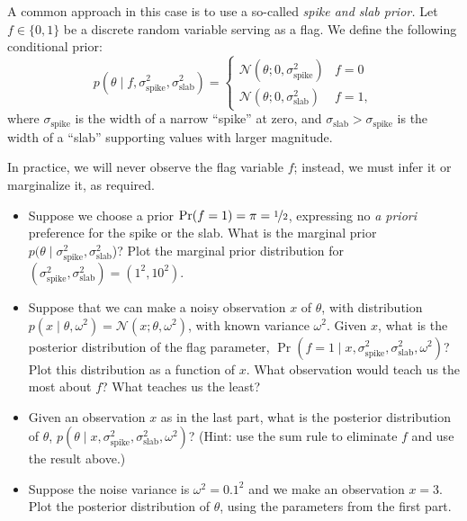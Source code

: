 \documentclass{article}
\newcommand{\given}{\mid}
\newcommand{\mc}[1]{\mathcal{#1}}
\begin{document}
\begin{enumerate}
  A common approach in this case is to use a so-called \emph{spike and
    slab prior.} Let $f \in \{0, 1\}$ be a discrete random variable
  serving as a flag.  We define the following conditional prior:
  \begin{equation*}
    p(\theta \given f, \sigma_{\text{spike}}^2, \sigma_{\text{slab}}^2)
    =
    \begin{cases}
      \mc{N}(\theta; 0, \sigma_{\text{spike}}^2) & f = 0 \\
      \mc{N}(\theta; 0, \sigma_{\text{slab}}^2)  & f = 1,
    \end{cases}
  \end{equation*}
  where $\sigma_{\text{spike}}$ is the width of a narrow ``spike'' at
  zero, and $\sigma_{\text{slab}} > \sigma_{\text{spike}}$ is the
  width of a ``slab'' supporting values with larger magnitude.

  In practice, we will never observe the flag variable $f$; instead,
  we must infer it or marginalize it, as required.
  \begin{itemize}
  \item
    Suppose we choose a prior $\Pr(f = 1) = \pi = \nicefrac{1}{2}$,
    expressing no \emph{a priori} preference for the spike or the
    slab.  What is the marginal prior $p(\theta \given
    \sigma_{\text{spike}}^2, \sigma_{\text{slab}}^2$)?  Plot the
    marginal prior distribution for $(\sigma_{\text{spike}}^2,
    \sigma_{\text{slab}}^2) = (1^2, 10^2)$.
  \item
    Suppose that we can make a noisy observation $x$ of $\theta$, with
    distribution $p(x \given \theta, \omega^2) = \mc{N}(x; \theta,
    \omega^2)$, with known variance $\omega^2$.  Given $x$, what is
    the posterior distribution of the flag parameter, $\Pr(f = 1
    \given x, \sigma_{\text{spike}}^2, \sigma_{\text{slab}}^2,
    \omega^2)$?  Plot this distribution as a function of $x$.  What
    observation would teach us the most about $f$?  What teaches us
    the least?
  \item
    Given an observation $x$ as in the last part, what is the
    posterior distribution of $\theta$, $p(\theta \given x,
    \sigma_{\text{spike}}^2, \sigma_{\text{slab}}^2, \omega^2)$?
    (Hint: use the sum rule to eliminate $f$ and use the result
    above.)
  \item
    Suppose the noise variance is $\omega^2 = 0.1^2$ and we make an
    observation $x = 3$.  Plot the posterior distribution of $\theta$,
    using the parameters from the first part.
  \end{itemize}

\end{enumerate}
\end{document}
